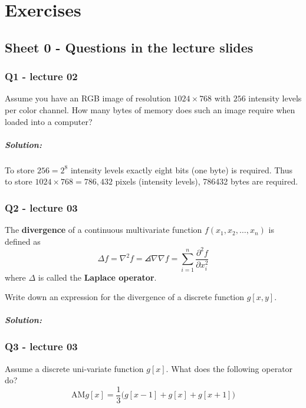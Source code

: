 
\chapter{Exercises}
\section{Sheet 0 - Questions in the lecture slides}

\subsection{Q1 - lecture 02} 
Assume you have an RGB image of resolution $1024\times 768$ with $256$ intensity levels per color channel. How many bytes of memory does such an image require when loaded into a computer?
\paragraph{Solution:} 
To store $256=2^8$ intensity levels exactly eight bits (one byte) is required. Thus to store $1024\times 768 = 786,432$ pixels (intensity levels), \num[group-separator={,}]{786432} bytes are required.

\subsection{Q2 - lecture 03} 
The \textbf{divergence} of a continuous multivariate function $f(x_1,x_2,\dots,x_n)$ is defined as 
\begin{equation}
	\Delta f = \nabla^2 f = \angles{\nabla}{\nabla f} = \sum_{i=1}^{n} \frac{\partial^2 f}{\partial x_i^2}
\end{equation}
where $\Delta$ is called the \textbf{Laplace operator}.

Write down an expression for the divergence of a discrete function $g[x,y]$.
\paragraph{Solution:} 

\subsection{Q3 - lecture 03} 
Assume a discrete uni-variate function $g[x]$. What does the following operator do?
\begin{equation}
	\text{AM}g[x] = \frac{1}{3}\big( g[x-1] + g[x] + g[x+1] \big)
\end{equation}
